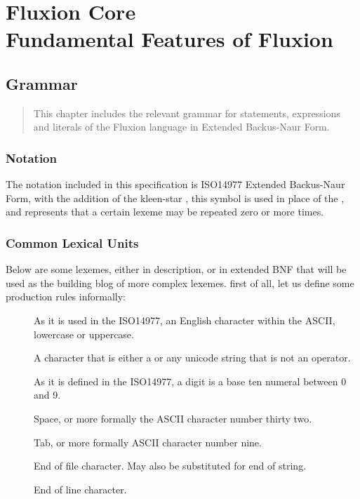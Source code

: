 \documentclass[11pt,a4paper]{book}
\begin{document}
\mainmatter
\part{Fluxion Core \\ \large{Fundamental Features of Fluxion}}

\chapter{Grammar}
\vspace{1em}
\begin{quotation}
This chapter includes the relevant grammar for statements, expressions and literals of the Fluxion language in Extended Backus-Naur Form.
\end{quotation}
\newpage


\section{Notation}

The notation included in this specification is ISO14977 Extended Backus-Naur Form, with the addition of the kleen-star , this symbol is used in place of the , and represents that a certain lexeme may be repeated zero or more times. 

\section{Common Lexical Units}

Below are some lexemes, either in description, or in extended BNF that will be used as the building blog of more complex lexemes. first of all, let us define some production rules informally:

\begin{description}
\item[] As it is used in the ISO14977, an English character within the ASCII, lowercase or uppercase.
\item[] A character that is either a  or any unicode string that is not an operator.
\item[] As it is defined in the ISO14977, a digit is a base ten numeral between 0 and 9.
\item[] Space, or more formally the ASCII character number thirty two.
\item[] Tab, or more formally ASCII character number nine.
\item[] End of file character. May also be substituted for end of string.
\item[] End of line character.
\end{description}
\end{document}
